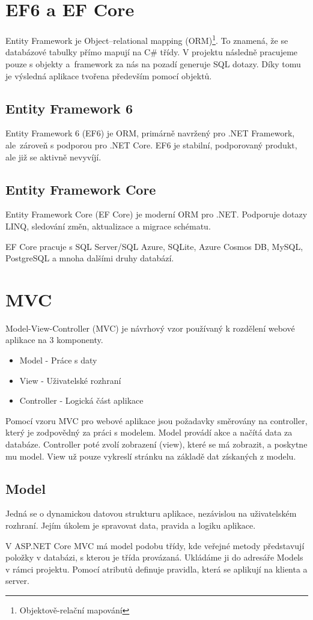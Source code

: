 \documentclass[a4paper, 12pt]{report}
\begin{document}
	\section{EF6 a EF Core}
    Entity Framework je Object–relational mapping (ORM)\footnote{Objektově-relační mapování}. To znamená, že se databázové tabulky přímo mapují na C\# třídy. V projektu následně pracujeme pouze s objekty a~framework za nás na pozadí generuje SQL dotazy. Díky tomu je výsledná aplikace tvořena především pomocí objektů.\cite{ASP.NET_Lekce8}

	\subsection{Entity Framework 6}
	Entity Framework 6 (EF6) je ORM, primárně navržený pro .NET Framework, ale~zároveň s podporou pro .NET Core. EF6 je stabilní, podporovaný produkt, ale již se aktivně nevyvíjí.\cite{EF6_EFCore}

	\subsection{Entity Framework Core}
	Entity Framework Core (EF Core) je moderní ORM pro .NET. Podporuje dotazy LINQ, sledování změn, aktualizace a migrace schématu.\par EF Core pracuje s SQL Server/SQL Azure, SQLite, Azure Cosmos DB, MySQL, PostgreSQL a mnoha dalšími druhy databází.\cite{EF6_EFCore}

	\section{MVC}
	Model-View-Controller (MVC) je návrhový vzor používaný k rozdělení webové aplikace na 3 komponenty.
	\begin{itemize}
		\item Model - Práce s daty
		\item View - Uživatelské rozhraní
		\item Controller - Logická část aplikace
	\end{itemize}\par
	Pomocí vzoru MVC pro webové aplikace jsou požadavky směrovány na controller, který je zodpovědný za práci s modelem. Model provádí akce a načítá data za databáze. Controller poté zvolí zobrazení (view), které se má zobrazit, a poskytne mu model. View už pouze vykreslí stránku na základě dat získaných z modelu.\cite{MVC}

	\subsection{Model} \label{Model_teorie}
	Jedná se o dynamickou datovou strukturu aplikace, nezávislou na uživatelském rozhraní. Jejím úkolem je spravovat data, pravida a logiku aplikace. \par
	V ASP.NET Core MVC má model podobu třídy, kde veřejné metody představují položky v databázi, s kterou je třída provázaná. Ukládáme ji do adresáře Models v rámci projektu. Pomocí atributů definuje pravidla, která se aplikují na klienta a server.\cite{MVC_Wiki_EN}
\end{document}
